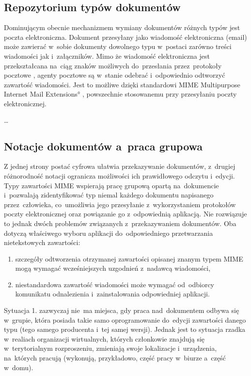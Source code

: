 \subsection{Repozytorium typów dokumentów}
\label{sec:RepozytoriumTypowDokumentow}

Dominującym obecnie mechanizmem wymiany dokumentów różnych typów jest poczta elektroniczna. Dokument przesyłany jako wiadomość elektroniczna (email) może zawierać w~sobie dokumenty dowolnego typu w~postaci zarówno treści wiadomości jak i~załączników. Mimo że wiadomość elektroniczna jest przekształcana na~ciąg znaków możliwych do~przesłania przez~protokoły pocztowe \cite{SMTP_RFC}, agenty pocztowe są w~stanie odebrać i~odpowiednio odtworzyć zawartość wiadomości. Jest to możliwe dzięki standardowi MIME \ang{Multipurpose Internet Mail Extensions}  \cite{mime-format}, powszechnie stosowanemu przy przesyłaniu poczty elektronicznej.

\dots

\subsection{Notacje dokumentów a~praca grupowa}
\label{sec:notacjaAPracaGrupowa}

Z jednej strony postać cyfrowa ułatwia przekazywanie dokumentów, z~drugiej różnorodność notacji ogranicza możliwości ich prawidłowego odczytu i~edycji.
Typy zawartości MIME wspierają pracę grupową opartą na~dokumencie i~pozwalają zidentyfikować typ niemal każdego dokumentu napisanego przez~człowieka, co~umożliwia jego przesyłanie z~wykorzystaniem protokołów poczty elektronicznej oraz powiązanie go z~odpowiednią aplikacją. Nie rozwiązuje to jednak dwóch problemów związanych z~przekazywaniem dokumentów. Oba dotyczą właściwego wyboru aplikacji do~odpowiedniego przetwarzania nietekstowych zawartości:

\begin{enumerate}
	\item szczegóły odtworzenia otrzymanej zawartości opisanej znanym typem MIME mogą wymagać wcześniejszych uzgodnień z~nadawcą wiadomości,
	\item niestandardowa zawartość wiadomości może wymagać od~odbiorcy komunikatu odnalezienia i~zainstalowania odpowiedniej aplikacji.
	\label{mark:problemyZawartosci}
\end{enumerate}

Sytuacja 1. zazwyczaj nie~ma miejsca, gdy praca nad~dokumentem odbywa się w~grupie, która posiada takie samo oprogramowanie do~edycji zawartości danego typu (tego samego producenta i~tej samej wersji). Jednak jest to sytuacja rzadka w~realiach organizacji wirtualnych, których członkowie znajdują się w~terytorialnym rozproszeniu, zmieniają swoje lokalizacje i~urządzenia, na~których pracują (wykonują, przykładowo, część pracy w~biurze a~część w~domu).

